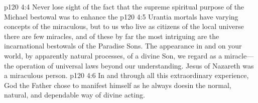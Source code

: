 \vs p120 4:4 Never lose sight of the fact that the supreme spiritual purpose of the Michael bestowal was to enhance the 
\pc \vs p120 4:5 Urantia mortals have varying concepts of the miraculous, but to us who live as citizens of the local universe there are few miracles, and of these by far the most intriguing are the incarnational bestowals of the Paradise Sons. The appearance in and on your world, by apparently natural processes, of a divine Son, we regard as a miracle---the operation of universal laws beyond our understanding. Jesus of Nazareth was a miraculous person.
\vs p120 4:6 In and through all this extraordinary experience, God the Father chose to manifest himself as he always doesin the normal, natural, and dependable way of divine acting.
